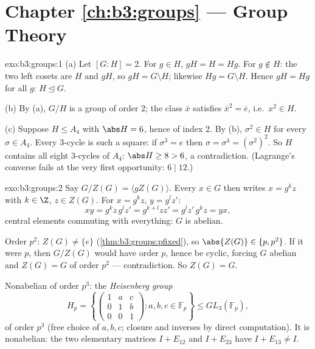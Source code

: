\section*{Chapter \ref{ch:b3:groups} --- Group Theory}

\begin{solution}{exo:b3:groups:1}
(a) Let $[G:H] = 2$. For $g \in H$, $gH = H = Hg$. For $g \notin
H$: the two left cosets are $H$ and $gH$, so $gH = G \setminus H$;
likewise $Hg = G \setminus H$. Hence $gH = Hg$ for all $g$: $H
\trianglelefteq G$.

(b) By (a), $G/H$ is a group of order $2$; the class $\bar x$
satisfies $\bar x^2 = \bar e$, i.e.\ $x^2 \in H$.

(c) Suppose $H \leq A_4$ with $\abs H = 6$, hence of index $2$. By
(b), $\sigma^2 \in H$ for every $\sigma \in A_4$. Every $3$-cycle
is such a square: if $\sigma^3 = e$ then $\sigma =
\sigma^4 = (\sigma^2)^2$. So $H$ contains all eight $3$-cycles of
$A_4$: $\abs H \geq 8 > 6$, a contradiction. (Lagrange's converse
fails at the very first opportunity: $6 \mid 12$.)
\end{solution}

\begin{solution}{exo:b3:groups:2}
Say $G/Z(G) = \langle gZ(G) \rangle$. Every $x \in G$ then writes
$x = g^k z$ with $k \in \Z$, $z \in Z(G)$. For $x = g^kz$, $y =
g^l z'$:
\[
xy = g^k z\, g^l z' = g^{k+l} z z' = g^l z'\, g^k z = yx,
\]
central elements commuting with everything: $G$ is abelian.

Order $p^2$: $Z(G) \neq \{e\}$ (\cref{thm:b3:groups:pfixed}), so
$\abs{Z(G)} \in \{p, p^2\}$. If it were $p$, then $G/Z(G)$ would
have order $p$, hence be cyclic, forcing $G$ abelian and $Z(G) =
G$ of order $p^2$ --- contradiction. So $Z(G) = G$.

Nonabelian of order $p^3$: the \emph{Heisenberg group}
\[
H_p = \left\{ \begin{pmatrix} 1 & a & c\\ 0 & 1 & b\\ 0 & 0 & 1
\end{pmatrix} : a, b, c \in \mathbb F_p \right\}
\leq GL_3(\mathbb F_p),
\]
of order $p^3$ (free choice of $a, b, c$; closure and inverses by
direct computation). It is nonabelian: the two elementary matrices
$I + E_{12}$ and $I + E_{23}$ have  $I + E_{13} \neq I$.
\end{solution}

